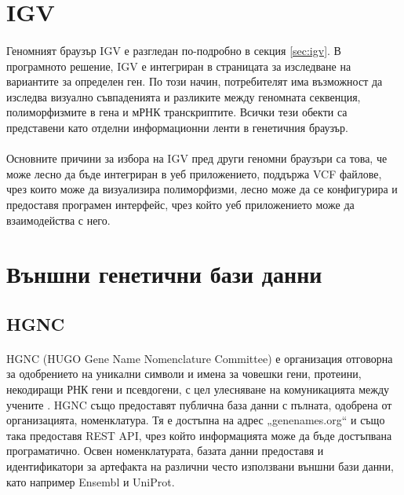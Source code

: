 \documentclass[pdftex,cyrillic,14pt,a4page,twoside,openright]{extreport}
\begin{document}
\section{IGV}
\paragraph{}
Геномният браузър IGV е разгледан по-подробно в секция \ref{sec:igv}. В програмното решение, IGV е интегриран в страницата за изследване на вариантите за определен ген. По този начин, потребителят има възможност да изследва визуално съвпаденията и разликите между геномната секвенция, полиморфизмите в гена и мРНК транскриптите. Всички тези обекти са представени като отделни информационни ленти в генетичния браузър.

\paragraph{}
Основните причини за избора на IGV пред други геномни браузъри са това, че може лесно да бъде интегриран в уеб приложението, поддържа VCF файлове, чрез които може да визуализира полиморфизми, лесно може да се конфигурира и предоставя програмен интерфейс, чрез който уеб приложението може да взаимодейства с него.

\section{Външни генетични бази данни}

\subsection{HGNC}\label{sec:hgnc}
\paragraph{}
HGNC (HUGO Gene Name Nomenclature Committee) е организация отговорна за одобрението на уникални символи и имена за човешки гени, протеини, некодиращи РНК гени и псевдогени, с цел улесняване на комуникацията между учените \cite{povey2001hugo}. HGNC също предоставят публична база данни с пълната, одобрена от организацията, номенклатура. Тя е достъпна на адрес „genenames.org“ и също така предоставя REST API, чрез който информацията може да бъде достъпвана програматично. Освен номенклатурата, базата данни предоставя и идентификатори за артефакта на различни често използвани външни бази данни, като например Ensembl и UniProt.
\end{document}
